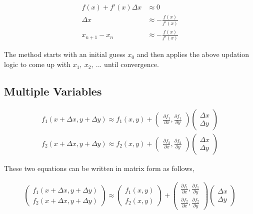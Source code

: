 \documentclass[11pt, a4paper]{article}
\begin{document}
\begin{align*}
	f(x) + f'(x) \Delta x & \approx 0                    \\
	\Delta x              & \approx - \frac{f(x)}{f'(x)} \\
	x_{n+1} - x_{n}       & \approx - \frac{f(x)}{f'(x)} 
\end{align*}

The method starts with an initial guess $x_0$ and then applies the above updation logic to come up with $x_1,\ x_2,\ ...$ until convergence.

\subsection{Multiple Variables}

\begin{align*}
	f_1(x+\Delta x, y+\Delta y) \approx f_1(x, y) + \begin{pmatrix} \frac{\partial f_1}{\partial x}, \frac{\partial f_1}{\partial y} \end{pmatrix} \begin{pmatrix} \Delta x \\ \Delta y \end{pmatrix} \\
	f_2(x+\Delta x, y+\Delta y) \approx f_2(x, y) + \begin{pmatrix} \frac{\partial f_2}{\partial x}, \frac{\partial f_2}{\partial y} \end{pmatrix} \begin{pmatrix} \Delta x \\ \Delta y \end{pmatrix} 	
\end{align*}

These two equations can be written in matrix form as follows,

\begin{align*}
	\begin{pmatrix} f_1(x+\Delta x, y+\Delta y) \\ f_2(x+\Delta x, y+\Delta y)\end{pmatrix} \approx \begin{pmatrix} f_1(x, y) \\ f_2(x, y) \end{pmatrix} + \begin{pmatrix} \frac{\partial f_1}{\partial x}, \frac{\partial f_1}{\partial y} \\ \frac{\partial f_2}{\partial x}, \frac{\partial f_2}{\partial y}\end{pmatrix} \begin{pmatrix} \Delta x \\ \Delta y \end{pmatrix} 
\end{align*}
\end{document}
